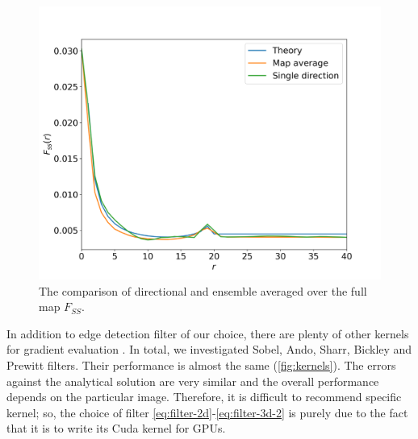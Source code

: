 \documentclass[reprint,amsmath,amssymb,aps,pre,showkeys,showpacs]{revtex4-1}
\begin{document}
\begin{figure}[ht]
  \centering
  \includegraphics[width=\linewidth]{images/direction_and_map.png}
  \caption{The comparison of directional and ensemble averaged over the full map
    $F_{SS}$.}
  \label{fig:direction-vs-map}
\end{figure}

In addition to edge detection filter of our choice, there are plenty of other
kernels for gradient evaluation \cite{bickley1948,prewitt1970,ando2000}. In
total, we investigated Sobel, Ando, Sharr, Bickley and Prewitt filters. Their
performance is almost the same (\cref{fig:kernels}). The errors against the
analytical solution are very similar and the overall performance depends on the
particular image. Therefore, it is difficult to recommend specific kernel; so,
the choice of filter \cref{eq:filter-2d}-\cref{eq:filter-3d-2} is purely due to
the fact that it is to write its Cuda kernel for GPUs.
\end{document}
